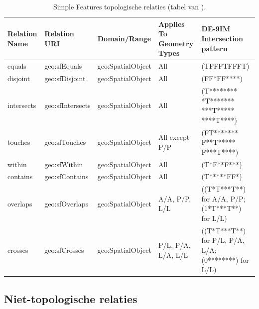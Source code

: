 \begin{table}[ht]
    \centering
    \begin{tabular}{ |p{1.5cm}|l|l|p{2cm}|p{2.5cm}| } 
        \hline
        \rowcolor{TableHeaderColor} Relation Name & Relation URI & Domain/Range & Applies To Geometry Types & DE-9IM Intersection pattern \\ \hline
        
        \rowcolor{TableColor} equals & geo:sfEquals & geo:SpatialObject & All & (TFFFTFFFT) \\ \hline
        
        \rowcolor{TableColor} disjoint & geo:sfDisjoint & geo:SpatialObject & All & (FF*FF****) \\ \hline
        
        \rowcolor{TableColor} intersects & geo:sfIntersects & geo:SpatialObject & All & (T********
        *T*******
        ***T*****
        ****T****)  \\ \hline
        
        \rowcolor{TableColor} touches & geo:sfTouches & geo:SpatialObject & All except P/P & (FT*******
        F**T*****
        F***T****) \\ \hline
        
        \rowcolor{TableColor} within & geo:sfWithin & geo:SpatialObject & All & (T*F**F***) \\ \hline
        
        \rowcolor{TableColor} contains & geo:sfContains & geo:SpatialObject & All & (T*****FF*) \\ \hline
        
        \rowcolor{TableColor} overlaps & geo:sfOverlaps & geo:SpatialObject & A/A, P/P, L/L & ((T*T***T**)
        for A/A, P/P;
        (1*T***T**)
        for L/L) \\ \hline
        
        \rowcolor{TableColor} crosses & geo:sfCrosses & geo:SpatialObject & P/L, P/A, L/A, L/L & ((T*T***T**)
        for P/L, P/A,
         L/A;
        (0********)
        for L/L) \\ \hline
        
    \end{tabular}
    \caption{Simple Features topologische relaties (tabel van \cite{ogcdocs}).}
    \label{tab:topo_sf}
\end{table}


\subsection{Niet-topologische relaties}

